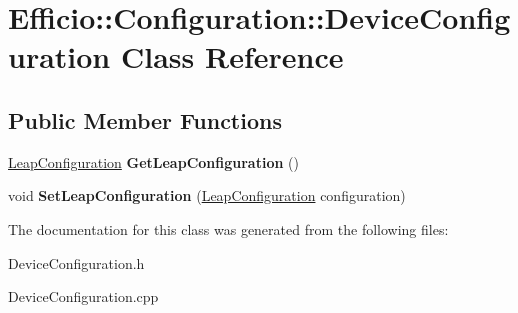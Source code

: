 \hypertarget{class_efficio_1_1_configuration_1_1_device_configuration}{}\section{Efficio\+:\+:Configuration\+:\+:Device\+Configuration Class Reference}
\label{class_efficio_1_1_configuration_1_1_device_configuration}
\subsection*{Public Member Functions}
\begin{DoxyCompactItemize}
\item 
\hyperlink{class_efficio_1_1_configuration_1_1_leap_configuration}{Leap\+Configuration} {\bfseries Get\+Leap\+Configuration} ()\hypertarget{class_efficio_1_1_configuration_1_1_device_configuration_af69abeef55ea8ef47a5bf1f4651a1eb1}{}\label{class_efficio_1_1_configuration_1_1_device_configuration_af69abeef55ea8ef47a5bf1f4651a1eb1}

\item 
void {\bfseries Set\+Leap\+Configuration} (\hyperlink{class_efficio_1_1_configuration_1_1_leap_configuration}{Leap\+Configuration} configuration)\hypertarget{class_efficio_1_1_configuration_1_1_device_configuration_aa9b8cedb924b8e45d06015e02b2cb25e}{}\label{class_efficio_1_1_configuration_1_1_device_configuration_aa9b8cedb924b8e45d06015e02b2cb25e}

\end{DoxyCompactItemize}


The documentation for this class was generated from the following files\+:\begin{DoxyCompactItemize}
\item 
Device\+Configuration.\+h\item 
Device\+Configuration.\+cpp\end{DoxyCompactItemize}
